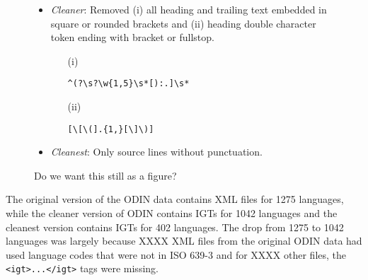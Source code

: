 \begin{figure}
\begin{itemize}
\item \emph{Cleaner}: Removed (i) all heading and trailing text embedded in square or rounded brackets and (ii) heading double character token ending with bracket or fullstop.
\begin{itemize}
\item[(i)]
\begin{Verbatim}
^(?\s?\w{1,5}\s*[):.]\s*
\end{Verbatim}
\item[(ii)] 
\begin{Verbatim}
[\[\(].{1,}[\]\)]
\end{Verbatim}
\end{itemize}
\item \emph{Cleanest}: Only source lines without punctuation.
\end{itemize}
\caption{Do we want this still as a figure?}
\end{figure}




\noindent The original version of the ODIN data contains XML files for 1275 languages, while the cleaner version of ODIN contains IGTs for 1042 languages and the cleanest version contains IGTs for 402 languages. The drop from 1275 to 1042 languages was largely because {\color{red} XXXX} XML files from the original ODIN data had used language codes that were not in ISO 639-3 and for {\color{red} XXXX} other files, the \texttt{<igt>...</igt>} tags were missing. 



